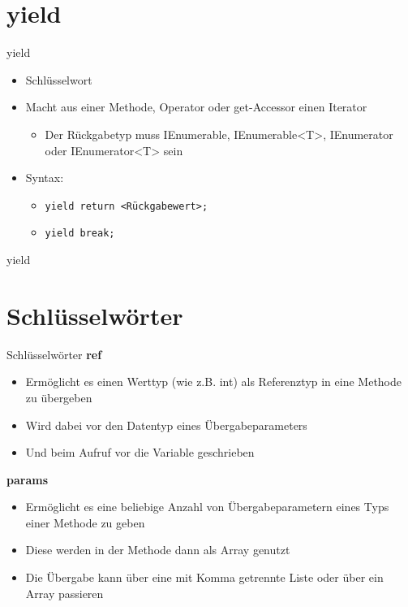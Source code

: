 \section{yield}
\begin{frame}{yield}
	\begin{itemize}
		\item Schlüsselwort
		\item Macht aus einer Methode, Operator oder get-Accessor einen Iterator
		\begin{itemize}
			\item Der Rückgabetyp muss \alert{IEnumerable}, \alert{IEnumerable<T>}, \alert{IEnumerator} oder \alert{IEnumerator<T>} sein
		\end{itemize}
		\item Syntax:
		\begin{itemize}
			\item \texttt{\alert{yield} return \alert{<Rückgabewert>};}
			\item \texttt{\alert{yield} break;}
		\end{itemize}
	\end{itemize}
\end{frame}

\begin{frame}{yield}
		
\end{frame}

\section{Schlüsselwörter}
\begin{frame}{Schlüsselwörter}
	\textbf{ref}\\
	\begin{itemize}
		\item Ermöglicht es einen Werttyp (wie z.B. int) als Referenztyp in eine Methode zu übergeben
		\item Wird dabei vor den Datentyp eines Übergabeparameters
		\item Und beim Aufruf vor die Variable geschrieben
	\end{itemize}
	\textbf{params}\\
	\begin{itemize}
		\item Ermöglicht es eine beliebige Anzahl von Übergabeparametern eines Typs einer Methode zu geben
		\item Diese werden in der Methode dann als Array genutzt
		\item Die Übergabe kann über eine mit Komma getrennte Liste oder über ein Array passieren
	\end{itemize}
\end{frame}

